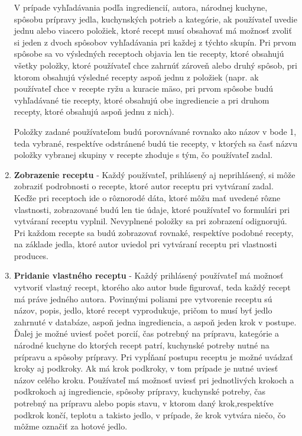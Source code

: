 \begin{enumerate}
V prípade vyhľadávania podľa ingrediencií, autora, národnej kuchyne, spôsobu prípravy jedla, kuchynských potrieb a kategórie, ak používateľ uvedie jednu alebo viacero položiek, ktoré recept musí obsahovať má možnosť zvoliť si jeden z dvoch spôsobov vyhľadávania pri každej z týchto skupín. Pri prvom spôsobe sa vo výsledných receptoch objavia len tie recepty, ktoré obsahujú všetky položky, ktoré používateľ chce zahrnúť zároveň alebo druhý spôsob, pri ktorom obsahujú výsledné recepty aspoň jednu z položiek (napr. ak používateľ chce v recepte ryžu a kuracie mäso, pri prvom spôsobe budú vyhľadávané tie recepty, ktoré obsahujú obe ingrediencie a pri druhom recepty, ktoré obsahujú aspoň jednu z nich).

Položky zadané používateľom budú porovnávané rovnako ako názov v bode 1, teda vybrané, respektíve odstránené budú tie recepty, v ktorých sa časť názvu položky vybranej skupiny v recepte zhoduje s tým, čo používateľ zadal. 

\item \textbf{Zobrazenie receptu} - Každý používateľ, prihlásený aj neprihlásený, si môže zobraziť podrobnosti o recepte, ktoré autor receptu pri vytváraní zadal. Keďže pri receptoch ide o rôznorodé dáta, ktoré môžu mať uvedené rôzne vlastnosti, zobrazované budú len tie údaje, ktoré používateľ vo formulári pri vytváraní receptu  vyplnil. Nevyplnené položky sa pri zobrazení odignorujú. Pri každom recepte sa budú zobrazovať rovnaké, respektíve podobné recepty, na základe jedla, ktoré autor uviedol pri vytváraní receptu pri vlastnosti produces. 

\item \textbf{Pridanie vlastného receptu} - Každý prihlásený používateľ má možnosť vytvoriť vlastný recept, ktorého ako autor bude figurovať, teda každý recept má práve jedného autora. Povinnými poliami pre vytvorenie receptu sú názov, popis, jedlo, ktoré recept vyprodukuje, pričom to musí byť jedlo zahrnuté v databáze, aspoň jedna ingrediencia, a aspoň jeden krok v postupe. Ďalej je možné uviesť počet porcií, čas potrebný na prípravu, kategórie a národné kuchyne do ktorých recept patrí, kuchynské potreby nutné na prípravu a spôsoby prípravy. Pri vypĺňaní postupu receptu je možné uvádzať kroky aj podkroky. Ak má krok podkroky, v tom prípade je nutné uviesť názov celého kroku. Používateľ má možnosť uviesť pri jednotlivých krokoch a podkrokoch aj ingrediencie, spôsoby prípravy, kuchynské potreby, čas potrebný na prípravu alebo popis stavu, v ktorom daný krok,respektíve podkrok končí, teplotu a takisto jedlo, v prípade, že krok vytvára niečo, čo môžme označiť za hotové jedlo. 


\end{enumerate}
